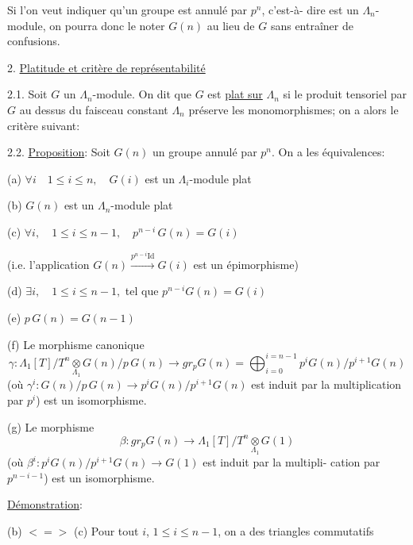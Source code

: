 \documentclass[11pt]{article}
\newcommand{\scanpage}[1]{\par\bigskip\noindent{\small\sffamily[scan #1]}\par}
\newcommand{\mspage}[1]{{\small\sffamily[p.\,#1]}}
\newcommand{\hand}[1]{\textcolor{blue}{#1}}
\newcommand{\uline}[1]{\underline{#1}}
\begin{document}
Si l'on veut indiquer qu'un groupe est annulé par $p^n$, c'est-à-%
dire est un $\Lambda_n$-module, on pourra donc le noter $G(n)$ au lieu de $G$ sans
entraîner de confusions.

\mspage{\hand{56}}

\clearpage
\scanpage{129/57}
\mspage{\hand{III-2}}

2. \uline{Platitude et critère de représentabilité}

2.1. Soit $G$ un $\Lambda_n$-module. On dit que $G$ est \uline{plat sur} $\Lambda_n$ si
le produit tensoriel par $G$ au dessus du faisceau constant $\Lambda_n$ préserve
les monomorphismes; on a alors le critère suivant:

2.2. \uline{Proposition}: Soit $G(n)$ un groupe annulé par $p^n$. On a les
équivalences:

(a) $\forall i \quad 1 \leq i \leq n, \quad G(i)$ est un $\Lambda_i$-module plat

(b) $G(n)$ est un $\Lambda_n$-module plat

(c) $\forall i, \quad 1 \leq i \leq n-1, \quad p^{n-i}\, G(n) = G(i)$

(i.e. l'application $G(n) \xrightarrow{p^{n-i}\mathrm{Id}} G(i)$ est un épimorphisme)

(d) $\exists i, \quad 1 \leq i \leq n-1,$ tel que $p^{n-i}G(n) = G(i)$

(e) $p\, G(n) = G(n-1)$

(f) Le morphisme canonique
\[ \gamma\colon \Lambda_1[T]/T^n \underset{\Lambda_1}{\otimes} G(n)/p\, G(n) \to gr_p G(n) = \bigoplus_{i=0}^{i=n-1} p^i G(n)/p^{i+1}G(n) \]
(où $\gamma^i\colon G(n)/p\, G(n) \to p^i G(n)/p^{i+1}G(n)$ est induit par la
multiplication par $p^i$) est un isomorphisme.

(g) Le morphisme
\[ \beta\colon gr_p G(n) \to \Lambda_1[T]/T^n \underset{\Lambda_1}{\otimes} G(1) \]
(où $\beta^i\colon p^i G(n)/p^{i+1}G(n) \to G(1)$ est induit par la multipli-%
cation par $p^{n-i-1}$) est un isomorphisme.

\uline{Démonstration}:

(b) $<=>$ (c) Pour tout $i$, $1 \leq i \leq n-1$, on a des triangles commutatifs
\end{document}
